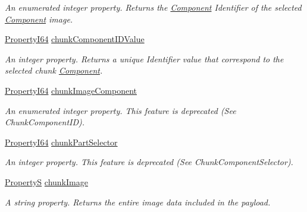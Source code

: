 \begin{DoxyCompactItemize}
\begin{DoxyCompactList}\small\item\em An enumerated integer property. Returns the \hyperlink{classmv_i_m_p_a_c_t_1_1acquire_1_1_component}{Component} Identifier of the selected \hyperlink{classmv_i_m_p_a_c_t_1_1acquire_1_1_component}{Component} image. \end{DoxyCompactList}\item 
\hyperlink{group___common_interface_ga81749b2696755513663492664a18a893}{Property\+I64} \hyperlink{classmv_i_m_p_a_c_t_1_1acquire_1_1_gen_i_cam_1_1_chunk_data_control_a9ff4b23f4b20e7aa48c31fa742a7b8fb}{chunk\+Component\+I\+D\+Value}
\begin{DoxyCompactList}\small\item\em An integer property. Returns a unique Identifier value that correspond to the selected chunk \hyperlink{classmv_i_m_p_a_c_t_1_1acquire_1_1_component}{Component}. \end{DoxyCompactList}\item 
\hyperlink{group___common_interface_ga81749b2696755513663492664a18a893}{Property\+I64} \hyperlink{classmv_i_m_p_a_c_t_1_1acquire_1_1_gen_i_cam_1_1_chunk_data_control_a0abd13d321577a5794abad963840cc6c}{chunk\+Image\+Component}
\begin{DoxyCompactList}\small\item\em An enumerated integer property. This feature is deprecated (See Chunk\+Component\+I\+D). \end{DoxyCompactList}\item 
\hyperlink{group___common_interface_ga81749b2696755513663492664a18a893}{Property\+I64} \hyperlink{classmv_i_m_p_a_c_t_1_1acquire_1_1_gen_i_cam_1_1_chunk_data_control_af192e7c6c38acc638f7bdfc18bb7f96e}{chunk\+Part\+Selector}
\begin{DoxyCompactList}\small\item\em An integer property. This feature is deprecated (See Chunk\+Component\+Selector). \end{DoxyCompactList}\item 
\hyperlink{classmv_i_m_p_a_c_t_1_1acquire_1_1_property_s}{Property\+S} \hyperlink{classmv_i_m_p_a_c_t_1_1acquire_1_1_gen_i_cam_1_1_chunk_data_control_ac35c9adb7b18011c9dcae2b2e07fd728}{chunk\+Image}
\begin{DoxyCompactList}\small\item\em A string property. Returns the entire image data included in the payload. \end{DoxyCompactList}\item 

\end{DoxyCompactItemize}
